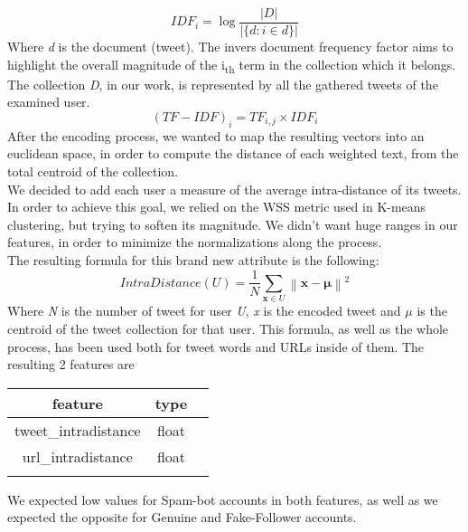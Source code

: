 \[ IDF_{i} =\log {\frac {|D|}{|\{d:i\in d\}|}} \]
Where \textit{d} is the document (tweet).
The invers document frequency factor aims to highlight the overall magnitude of the  i\textsubscript{th} term in the collection  which it belongs. The collection \textit{D}, in our work, is represented by all the gathered tweets of the examined user.
\[(TF-IDF)_{i} = TF_{i,j} \times IDF_{i} \]
After the encoding process, we wanted to map the resulting vectors into an euclidean space, in order to compute the distance of each weighted text, from the total centroid of the collection.\\
We decided to add each user a measure of the average intra-distance of its tweets.\\
In order to achieve this goal, we relied on the WSS metric used in K-means clustering, but trying to soften its magnitude. We didn't want huge ranges in our features, in order to minimize the normalizations along the process.\\
The resulting formula for this brand new attribute is the following:
\[IntraDistance(U) = \frac{1}{N}\sum _{\mathbf {x} \in U}\left\|\mathbf {x} -{\boldsymbol {\mu }}\right\|^{2}\]
Where \textit{N} is the number of tweet for user \textit{U}, \textit{x} is the encoded tweet and $\mu$ is the centroid of the tweet collection for that user.
This formula, as well as the whole process, has been used both for tweet words and URLs inside of them.
The resulting 2 features are
\small
\begin{center}
	\begin{tabular}{ccc}
		\\feature&type\\
		\hline\hline
		tweet\_intradistance&float\\
		url\_intradistance&float\\\hline\\
	\end{tabular}
\end{center}
\normalsize
We expected low values for Spam-bot accounts in both features, as well as we expected the opposite for Genuine and Fake-Follower accounts.


